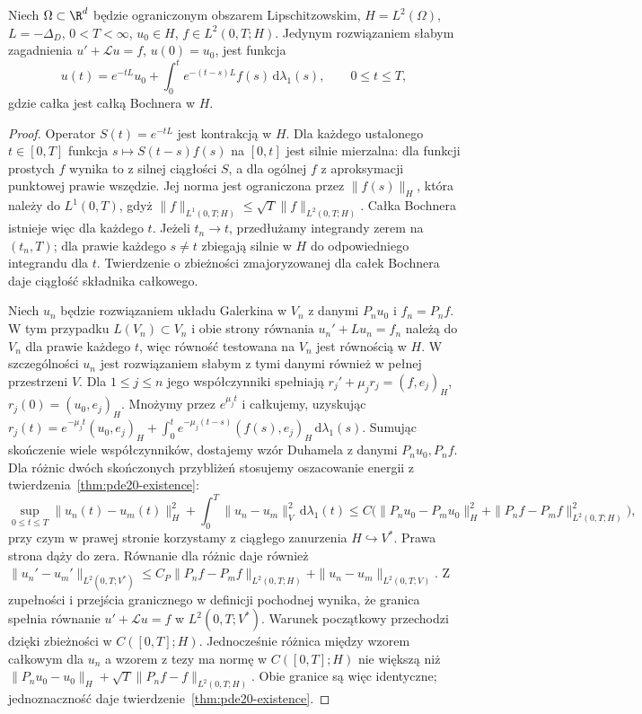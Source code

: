 \begin{twierdzenie}
\label{thm:pde20-duhamel}
Niech $\Omega\subset\R^d$ będzie ograniczonym obszarem
Lipschitzowskim, $H=L^2(\Omega)$, $L=-\Delta_D$,
$0<T<\infty$, $u_0\in H$, $f\in L^2(0,T;H)$.
Jedynym rozwiązaniem słabym zagadnienia $u'+\mathcal Lu=f$,
$u(0)=u_0$, jest funkcja
\[
 u(t)=e^{-tL}u_0+\int_0^t e^{-(t-s)L}f(s)\,\mathrm d\lambda_1(s),
 \qquad 0\le t\le T,
\]
gdzie całka jest całką Bochnera w $H$.
\end{twierdzenie}
\begin{proof}
Operator $S(t)=e^{-tL}$ jest kontrakcją w $H$.
Dla każdego ustalonego $t\in[0,T]$ funkcja
$s\mapsto S(t-s)f(s)$ na $[0,t]$ jest silnie
mierzalna: dla funkcji prostych $f$ wynika to
z silnej ciągłości $S$, a dla ogólnej $f$
z aproksymacji punktowej prawie wszędzie.
Jej norma jest ograniczona przez $\|f(s)\|_H$,
która należy do $L^1(0,T)$, gdyż
$\|f\|_{L^1(0,T;H)}\le\sqrt T\|f\|_{L^2(0,T;H)}$.
Całka Bochnera istnieje więc dla każdego $t$.
Jeżeli $t_n\to t$, przedłużamy integrandy zerem
na $(t_n,T)$; dla prawie każdego $s\ne t$
zbiegają silnie w $H$ do odpowiedniego integrandu
dla $t$. Twierdzenie o zbieżności zmajoryzowanej
dla całek Bochnera daje ciągłość składnika całkowego.

Niech $u_n$ będzie rozwiązaniem układu Galerkina
w $V_n$ z danymi $P_nu_0$ i $f_n=P_nf$.
W tym przypadku $L(V_n)\subset V_n$ i obie strony
równania $u_n'+Lu_n=f_n$ należą do $V_n$ dla prawie każdego
$t$, więc równość testowana na $V_n$ jest równością w $H$.
W szczególności $u_n$ jest rozwiązaniem słabym
z tymi danymi również w pełnej przestrzeni $V$. Dla $1\le j\le n$
jego współczynniki spełniają
$r_j'+\mu_jr_j=(f,e_j)_H$,
$r_j(0)=(u_0,e_j)_H$. Mnożymy przez $e^{\mu_jt}$
i całkujemy, uzyskując
$r_j(t)=e^{-\mu_jt}(u_0,e_j)_H+
\int_0^t e^{-\mu_j(t-s)}(f(s),e_j)_H
\,\mathrm d\lambda_1(s)$.
Sumując skończenie wiele współczynników, dostajemy
wzór Duhamela z danymi $P_nu_0,P_nf$. Dla różnic dwóch skończonych przybliżeń
stosujemy oszacowanie energii z
twierdzenia~\ref{thm:pde20-existence}:
\[
 \sup_{0\le t\le T}\|u_n(t)-u_m(t)\|_H^2
 +\int_0^T\|u_n-u_m\|_V^2\,\mathrm d\lambda_1(t)
 \le C\bigl(\|P_nu_0-P_mu_0\|_H^2
 +\|P_nf-P_mf\|_{L^2(0,T;H)}^2\bigr),
\]
przy czym w prawej stronie korzystamy z ciągłego
zanurzenia $H\hookrightarrow V^*$. Prawa strona dąży do
zera. Równanie dla różnic daje również
$\|u_n'-u_m'\|_{L^2(0,T;V^*)}\le
 C_P\|P_nf-P_mf\|_{L^2(0,T;H)}
 +\|u_n-u_m\|_{L^2(0,T;V)}$.
Z zupełności i przejścia granicznego w definicji
pochodnej wynika, że granica spełnia równanie
$u'+\mathcal Lu=f$ w $L^2(0,T;V^*)$.
Warunek początkowy przechodzi dzięki zbieżności
w $C([0,T];H)$. Jednocześnie różnica między wzorem
całkowym dla $u_n$ a wzorem z tezy ma normę w
$C([0,T];H)$ nie większą niż
$\|P_nu_0-u_0\|_H+\sqrt T\|P_nf-f\|_{L^2(0,T;H)}$.
Obie granice są więc identyczne; jednoznaczność
daje twierdzenie~\ref{thm:pde20-existence}.
\end{proof}

